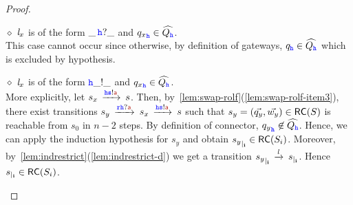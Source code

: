 \begin{proof}
\begin{description}
%
\item
\underline{$\diamond$}
$\mathit{l}_x$ is of the form $\_\,{\mathtt{\color{blue}{ {h}}}}?\_$ and ${q_x}_{\mathtt{\color{blue}{ {h}}}}\in\widehat{Q_{{\mathtt{\color{blue}{ {h}}}}}}$.\\
This case cannot occur since otherwise,
by definition of gateways,
${q}_{{\mathtt{\color{blue}{ {h}}}}}\in\widehat{Q_{{\mathtt{\color{blue}{ {h}}}}}}$ which is excluded by hypothesis. 
%
\item
\underline{$\diamond$}
$\mathit{l}_x$ is of the form ${\mathtt{\color{blue}{ {h}}}}\_!\_$  and ${q_x}_{\mathtt{\color{blue}{ {h}}}}\in\widehat{Q_{{\mathtt{\color{blue}{ {h}}}}}}$.\\
More explicitly, let $s_x\lts{\HH\tts!\msg[a]}s$.
Then, by~\cref{lem:swap-rolf}(\ref{lem:swap-rolf-item3}), there exist
transitions
$s_y \lts{\ttr\HH?\msg[a]}s_x\lts{\HH\tts!\msg[a]}s$
such that $s_y = (\vec{q_y},\vec{w_y})\in \mathsf{RC}(S)$ is reachable from $s_0$ in $n-2$ steps. By definition of connector, ${q_y}_{{\mathtt{\color{blue}{ {h}}}}} \not\in\widehat{Q_{{\mathtt{\color{blue}{ {h}}}}}}$.
Hence, we can apply the induction hypothesis for $s_y$ and obtain ${s_y}_{\mid_{\mathbf{i}}}\in \mathsf{RC}(S_i)$.
Moreover, by~\cref{lem:indrestrict}(\ref{lem:indrestrict-d}) we get a transition
${s_y}_{\mid_{\mathbf{i}}}\,\xrightarrow{\mathit{l}}_{{}}\,{s}_{\mid_{\mathbf{i}}}$. Hence ${s}_{\mid_{\mathbf{i}}}\in \mathsf{RC}(S_i)$.
\end{description}
\end{proof}

